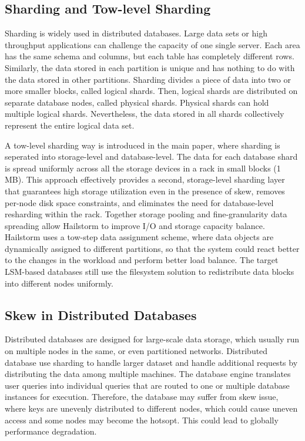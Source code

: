 \documentclass[a4paper,10pt,twoside]{article}
\begin{document}
\subsection{Sharding and Tow-level Sharding}
\label{Basic.sharding}
Sharding is widely used in distributed databases\cite{MongoDB_sharding1}. Large data sets or high throughput applications can challenge the capacity of one single server.
Each area has the same schema and columns, but each table has completely different rows. 
Similarly, the data stored in each partition is unique and has nothing to do with the data stored in other partitions.
Sharding divides a piece of data into two or more smaller blocks, called logical shards.
Then, logical shards are distributed on separate database nodes, called physical shards.
Physical shards can hold multiple logical shards. 
Nevertheless, the data stored in all shards collectively represent the entire logical data set.
\par
A tow-level sharding way is introduced in the main paper, where sharding is seperated into storage-level and database-level.
The data for each database shard is spread uniformly across all the storage devices in a rack in small blocks (1 MB).
This approach effectively provides a second, storage-level sharding layer that guarantees high storage utilization even in the presence of skew, removes per-node disk space constraints, and eliminates the need for database-level resharding within the rack. 
Together storage pooling and fine-granularity data spreading allow Hailstorm to improve I/O and storage capacity balance.
Hailstorm uses a tow-step data assignment scheme, where data objects are dynamically assigned to different partitions,  so that the system could react better to the changes in the workload and perform better load balance.
The target LSM-based databases still use the filesystem solution to redistribute data blocks into different nodes uniformly.


\subsection{Skew in Distributed Databases}
\label{Basic.skew}
Distributed databases \cite{mongodb,tidb} are designed for large-scale data storage, which usually run on multiple nodes in the same,
or even partitioned networks.
Distributed database use sharding to handle larger dataset and handle additional requests by distributing the data among multiple machines.
The database engine translates user queries into individual queries that are routed to one or multiple database instances for execution.
Therefore, the database may suffer from skew issue, where keys are unevenly distributed to different nodes, which could cause uneven access and some nodes may become the hotsopt.
This could lead to globally performance degradation.
\end{document}

